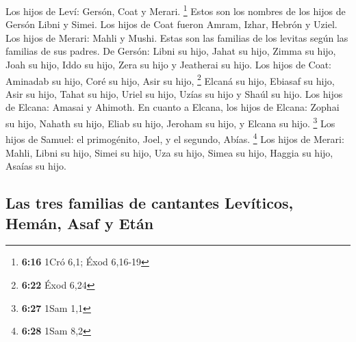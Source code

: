 \begin{paracol}{2}
 Los hijos de Leví: Gersón, Coat y Merari. \footnote{\textbf{6:16}
  1Cró 6,1; Éxod 6,16-19}  Estos son los nombres de los
hijos de Gersón Libni y Simei.  Los hijos de Coat fueron
Amram, Izhar, Hebrón y Uziel.  Los hijos de Merari: Mahli
y Mushi. Estas son las familias de los levitas según las familias de sus
padres.  De Gersón: Libni su hijo, Jahat su hijo, Zimma
su hijo,  Joah su hijo, Iddo su hijo, Zera su hijo y
Jeatherai su hijo.  Los hijos de Coat: Aminadab su hijo,
Coré su hijo, Asir su hijo, \footnote{\textbf{6:22} Éxod 6,24}
 Elcaná su hijo, Ebiasaf su hijo, Asir su hijo,
 Tahat su hijo, Uriel su hijo, Uzías su hijo y Shaúl su
hijo.  Los hijos de Elcana: Amasai y Ahimoth.
 En cuanto a Elcana, los hijos de Elcana: Zophai su hijo,
Nahath su hijo,  Eliab su hijo, Jeroham su hijo, y Elcana
su hijo. \footnote{\textbf{6:27} 1Sam 1,1}  Los hijos de
Samuel: el primogénito, Joel, y el segundo, Abías. \footnote{\textbf{6:28}
  1Sam 8,2}  Los hijos de Merari: Mahli, Libni su hijo,
Simei su hijo, Uza su hijo,  Simea su hijo, Haggia su
hijo, Asaías su hijo.

\hypertarget{las-tres-familias-de-cantantes-levuxedticos-hemuxe1n-asaf-y-etuxe1n}{%
\subsection{Las tres familias de cantantes Levíticos, Hemán, Asaf y
Etán}\label{las-tres-familias-de-cantantes-levuxedticos-hemuxe1n-asaf-y-etuxe1n}}


\end{paracol}
